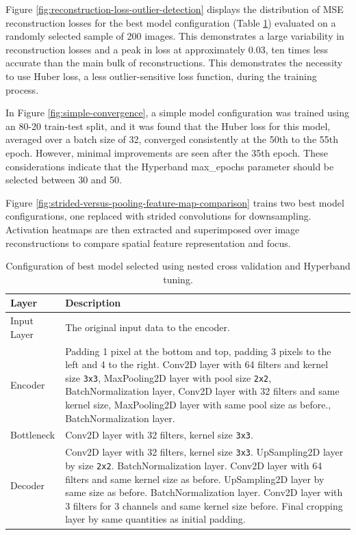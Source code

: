 \documentclass[10pt,twocolumn,letterpaper]{article}
\begin{document}
Figure \ref{fig:reconstruction-loss-outlier-detection} displays the distribution of MSE reconstruction losses for the best model configuration (Table \ref{tab:best-model-configuration}) evaluated on a randomly selected sample of 200 images. This demonstrates a large variability in reconstruction losses and a peak in loss at approximately 0.03, ten times less accurate than the main bulk of reconstructions. This demonstrates the necessity to use Huber loss, a less outlier-sensitive loss function, during the training process. 

In Figure \ref{fig:simple-convergence}, a simple model configuration was trained using an 80-20 train-test split, and it was found that the Huber loss for this model, averaged over a batch size of 32, converged consistently at the 50th to the 55th epoch. However, minimal improvements are seen after the 35th epoch. These considerations indicate that the Hyperband max\_epochs parameter should be selected between 30 and 50.

Figure \ref{fig:strided-versus-pooling-feature-map-comparison} trains two best model configurations, one replaced with strided convolutions for downsampling. Activation heatmaps are then extracted and superimposed over image reconstructions to compare spatial feature representation and focus.

\begin{table}[ht]
\centering
\begin{tabular}{|l|m{5cm}|}
\hline
\textbf{Layer} & \textbf{Description} \\
\hline
Input Layer & The original input data to the encoder. \\
\hline
Encoder & Padding 1 pixel at the bottom and top, padding 3 pixels to the left and 4 to the right. Conv2D layer with 64 filters and kernel size \texttt{3x3},  MaxPooling2D layer with pool size \texttt{2x2}, BatchNormalization layer, Conv2D layer with 32 filters and same kernel size, MaxPooling2D layer with same pool size as before., BatchNormalization layer.\\
\hline
Bottleneck & Conv2D layer with 32 filters, kernel size \texttt{3x3}.\\
\hline
Decoder & Conv2D layer with 32 filters, kernel size \texttt{3x3}. UpSampling2D layer by size \texttt{2x2}. BatchNormalization layer. Conv2D layer with 64 filters and same kernel size as before. UpSampling2D layer by same size as before. BatchNormalization layer. Conv2D layer with 3 filters for 3 channels and same kernel size before. Final cropping layer by same quantities as initial padding. \\
\end{tabular}
\caption{Configuration of best model selected using nested cross validation and Hyperband tuning.}
\label{tab:best-model-configuration}
\end{table}
\end{document}
